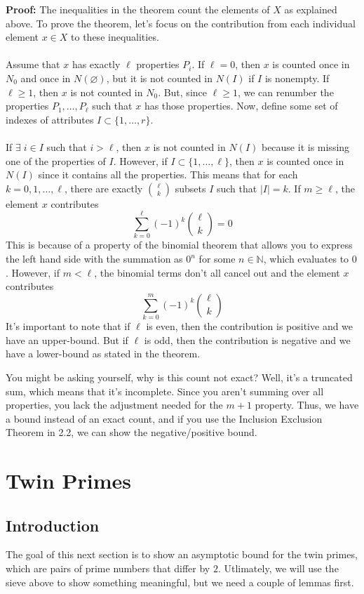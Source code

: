 \documentclass[8pt]{extarticle}
\begin{document}
\begin{boxedsection}
\textbf{Proof:} The inequalities in the theorem count the elements of $X$ as explained above. To prove the theorem, let's focus on the contribution from each individual element $x \in X$ to these inequalities.\\
\\
Assume that $x$ has exactly $\ell$ properties $P_i$. If $\ell = 0$, then $x$ is counted once in $N_0$ and once in $N(\varnothing)$, but it is not counted in $N(I)$ if $I$ is nonempty.  If $\ell \geq 1$, then $x$ is not counted in $N_0$. But, since $\ell \geq 1$, we can renumber the properties $P_1, \dots, P_\ell$ such that $x$ has those properties. Now, define some set of indexes of attributes $I \subset \{1,\dots,r\}$.\\
\\
If $\exists \; i \in I$ such that $i > \ell$, then $x$ is not counted in $N(I)$ because it is missing one of the properties of $I$. However, if $I \subset \{1,\dots,\ell\}$, then $x$ is counted once in $N(I)$ since it contains all the properties. This means that for each $k = 0,1,\dots,\ell$, there are exactly ${\ell \choose k}$ subsets $I$ such that $|I| = k$. If $m \geq \ell$, the element $x$ contributes 
$$
\sum_{k=0}^\ell (-1)^k {\ell \choose k} = 0
$$
This is because of a property of the binomial theorem that allows you to express the left hand side with the summation as $0^n$ for some $n \in \mathbb{N}$, which evaluates to $0$. However, if $m < \ell$, the binomial terms don't all cancel out and the element $x$ contributes
$$
\sum_{k=0}^m (-1)^k {\ell \choose k}
$$
It's important to note that if $\ell$ is even, then the contribution is positive and we have an upper-bound. But if $\ell$ is odd, then the contribution is negative and we have a lower-bound as stated in the theorem.
\end{boxedsection}
You might be asking yourself, why is this count not exact? Well, it's a truncated sum, which means that it's incomplete. Since you aren't summing over all properties, you lack the adjustment needed for the $m+1$ property. Thus, we have a bound instead of an exact count, and if you use the Inclusion Exclusion Theorem in 2.2, we can show the negative/positive bound.
\section{Twin Primes}
\subsection{Introduction}
The goal of this next section is to show an asymptotic bound for the twin primes, which are pairs of prime numbers that differ by $2$. Utlimately, we will use the sieve above to show something meaningful, but we need a couple of lemmas first.
\end{document}

